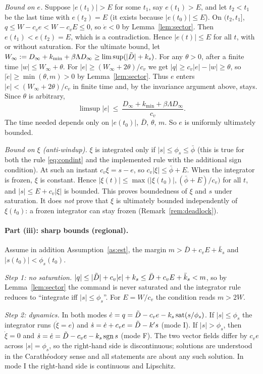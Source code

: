 \emph{Bound on $e$.} Suppose $|e(t_1)|>E$ for some $t_1$, say $e(t_1)>E$, and let $t_2<t_1$ be the last time with $e(t_2)=E$ (it exists because $|e(t_0)|\le E$). On $(t_2,t_1]$, $q\le W-c_ve<W-c_vE\le0$, so $\dot e<0$ by Lemma~\ref{lem:sector}. Then $e(t_1)<e(t_2)=E$, which is a contradiction. Hence $|e(t)|\le E$ for all $t$, with or without saturation. For the ultimate bound, let $W_\infty:=D_\infty+k_{\min}+\beta\Lambda D_\infty\ge\limsup(|\tilde{D}|+k_s)$. For any $\theta>0$, after a finite time $|w|\le W_\infty+\theta$. For $|e|\ge(W_\infty+2\theta)/c_v$ we get $|q|\ge c_v|e|-|w|\ge\theta$, so $|\dot e|\ge\min(\theta,m)>0$ by Lemma~\ref{lem:sector}. Thus $e$ enters $|e|<(W_\infty+2\theta)/c_v$ in finite time and, by the invariance argument above, stays. Since $\theta$ is arbitrary,
\[
\limsup|e|\ \le\ \frac{D_\infty+k_{\min}+\beta\Lambda D_\infty}{c_v}.
\]
The time needed depends only on $|e(t_0)|$, $\bar D$, $\theta$, $m$. So $e$ is uniformly ultimately bounded.

\emph{Bound on $\xi$ (anti-windup).} $\xi$ is integrated only if $|s|\le\phi_s\le\bar\phi$ (this is true for both the rule \eqref{eq:condint} and the implemented rule with the additional sign condition). At such an instant $c_v\xi=s-e$, so $c_v|\xi|\le\bar\phi+E$. When the integrator is frozen, $\xi$ is constant. Hence $|\xi(t)|\le\max\big(|\xi(t_0)|,(\bar\phi+E)/c_v\big)$ for all $t$, and $|s|\le E+c_v|\xi|$ is bounded. This proves boundedness of $\xi$ and $s$ under saturation. It does \emph{not} prove that $\xi$ is ultimately bounded independently of $\xi(t_0)$: a frozen integrator can stay frozen (Remark~\ref{rem:deadlock}).

\paragraph{Part (iii): sharp bounds (regional).} Assume in addition Assumption~\ref{as:est}, the margin $m>\bar D+c_vE+\bar k_s$ and $|s(t_0)|<\phi_s(t_0)$.

\emph{Step 1: no saturation.} $|q|\le|\tilde{D}|+c_v|e|+k_s\le\bar D+c_vE+\bar k_s<m$, so by Lemma~\ref{lem:sector} the command is never saturated and the integrator rule reduces to ``integrate iff $|s|\le\phi_s$''. For $E=W/c_v$ the condition reads $m>2W$.

\emph{Step 2: dynamics.} In both modes $\dot e=q=\tilde{D}-c_ve-k_s\,\mathrm{sat}(s/\phi_s)$. If $|s|\le\phi_s$ the integrator runs ($\dot\xi=e$) and $\dot s=\dot e+c_ve=\tilde{D}-k's$ (mode I). If $|s|>\phi_s$, then $\dot\xi=0$ and $\dot s=\dot e=\tilde{D}-c_ve-k_s\operatorname{sgn}s$ (mode F). The two vector fields differ by $c_ve$ across $|s|=\phi_s$, so the right-hand side is discontinuous; solutions are understood in the Carath\'eodory sense and all statements are about any such solution. In mode I the right-hand side is continuous and Lipschitz.

